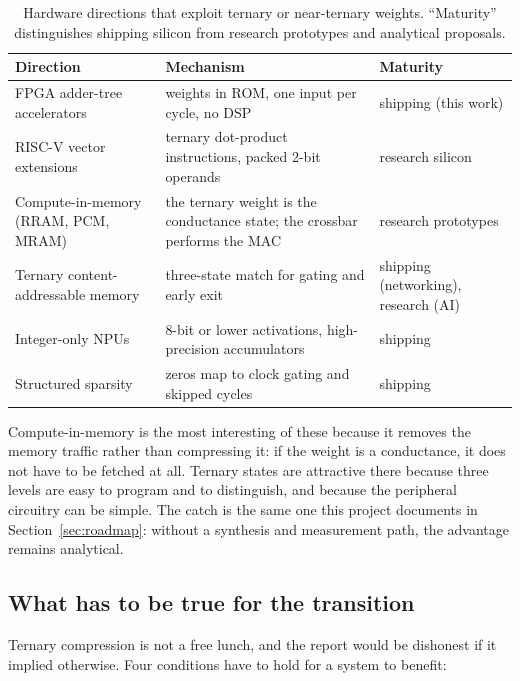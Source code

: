 \documentclass[11pt,a4paper]{article}
\begin{document}
\begin{table}[H]
\centering
\small
\caption{Hardware directions that exploit ternary or near-ternary weights.
  ``Maturity'' distinguishes shipping silicon from research prototypes and
  analytical proposals.}
\label{tab:ternaryhw}
\begin{tabularx}{\linewidth}{@{}l Y l@{}}
\toprule
\textbf{Direction} & \textbf{Mechanism} & \textbf{Maturity} \\
\midrule
FPGA adder-tree accelerators & weights in ROM, one input per cycle, no DSP &
  shipping (this work) \\
RISC-V vector extensions & ternary dot-product instructions, packed 2-bit
  operands & research silicon \\
Compute-in-memory (RRAM, PCM, MRAM) & the ternary weight is the conductance
  state; the crossbar performs the MAC & research prototypes \\
Ternary content-addressable memory & three-state match for gating and
  early exit & shipping (networking), research (AI) \\
Integer-only NPUs & 8-bit or lower activations, high-precision accumulators
  & shipping \\
Structured sparsity & zeros map to clock gating and skipped cycles & shipping \\
\bottomrule
\end{tabularx}
\end{table}

Compute-in-memory is the most interesting of these because it removes the
memory traffic rather than compressing it: if the weight is a conductance, it
does not have to be fetched at all. Ternary states are attractive there because
three levels are easy to program and to distinguish, and because the peripheral
circuitry can be simple. The catch is the same one this project documents in
Section~\ref{sec:roadmap}: without a synthesis and measurement path, the
advantage remains analytical.

\subsection{What has to be true for the transition}

Ternary compression is not a free lunch, and the report would be dishonest if it
implied otherwise. Four conditions have to hold for a system to benefit:
\end{document}
